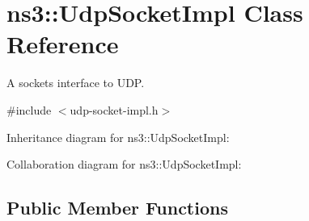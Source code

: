 \hypertarget{classns3_1_1UdpSocketImpl}{}\section{ns3\+:\+:Udp\+Socket\+Impl Class Reference}
\label{classns3_1_1UdpSocketImpl}


A sockets interface to U\+DP.  




{\ttfamily \#include $<$udp-\/socket-\/impl.\+h$>$}



Inheritance diagram for ns3\+:\+:Udp\+Socket\+Impl\+:


Collaboration diagram for ns3\+:\+:Udp\+Socket\+Impl\+:
\subsection*{Public Member Functions}
